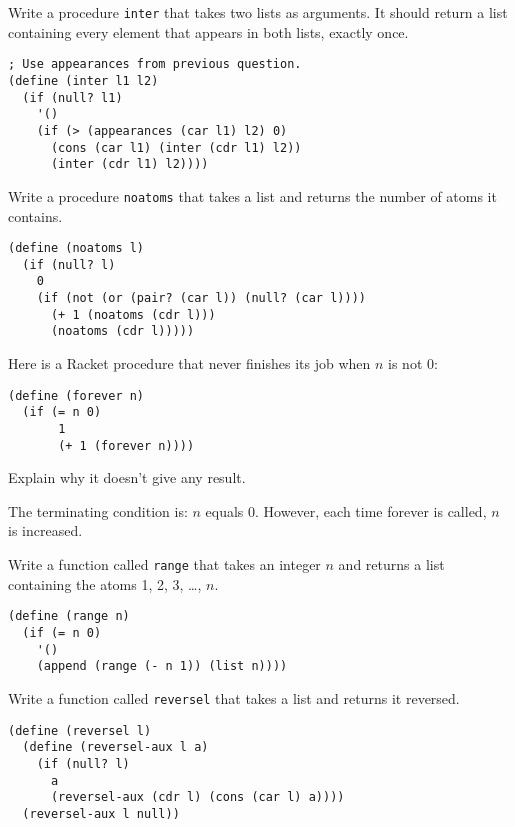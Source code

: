 \documentclass[a4paper, 12pt]{exam}
\begin{document}
\begin{questions}
\question
Write a procedure \texttt{inter} that takes two lists as arguments.
It should return a list containing every element that appears in both lists, exactly once.

\begin{solution}
  \begin{verbatim}
; Use appearances from previous question.
(define (inter l1 l2)
  (if (null? l1)
    '()
    (if (> (appearances (car l1) l2) 0)
      (cons (car l1) (inter (cdr l1) l2))
      (inter (cdr l1) l2))))
  \end{verbatim}
\end{solution}

\question
Write a procedure \texttt{noatoms} that takes a list and returns the number of atoms it contains.

\begin{solution}
  \begin{verbatim}
(define (noatoms l)
  (if (null? l)
    0
    (if (not (or (pair? (car l)) (null? (car l))))
      (+ 1 (noatoms (cdr l)))
      (noatoms (cdr l)))))
  \end{verbatim}
\end{solution}

\question
Here is a Racket procedure that never finishes its job when $n$ is not $0$:
\begin{verbatim}
(define (forever n)
  (if (= n 0)
       1
       (+ 1 (forever n))))
\end{verbatim}
Explain why it doesn’t give any result\cite{simplyscheme}.

\begin{solution}
The terminating condition is: $n$ equals 0.
However, each time forever is called, $n$ is increased.
\end{solution}

\question
Write a function called \texttt{range} that takes an integer $n$ and returns a list containing the atoms 1, 2, 3, \ldots, $n$.

\begin{solution}
\begin{verbatim}
(define (range n)
  (if (= n 0)
    '()
    (append (range (- n 1)) (list n))))
\end{verbatim}
\end{solution}

\question
Write a function called \texttt{reversel} that takes a list and returns it reversed.  

\begin{solution}
\begin{verbatim}
(define (reversel l)
  (define (reversel-aux l a)
    (if (null? l)
      a
      (reversel-aux (cdr l) (cons (car l) a))))
  (reversel-aux l null))
\end{verbatim}
\end{solution}


\end{questions}
\end{document}
